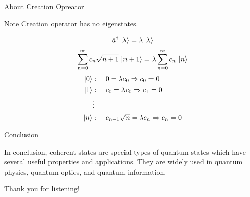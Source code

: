 \documentclass{loyola-beamer}
\begin{document}
\begin{frame}{About Creation Opreator}
    \begin{alertblock}{Note}
        Creation operator has no eigenstates.
    \end{alertblock}
    \begin{align*}
        \hat{a}^\dagger \ket{\lambda} = \lambda \ket{\lambda}
    \end{align*}
    \begin{align*}
        \sum_{n=0}^\infty c_n \sqrt{n+1}\, \ket{n+1}
        = \lambda \sum_{n=0}^\infty c_n\, \ket{n}
    \end{align*}
    \begin{align*}
        \ket{0} & : \quad 0 = \lambda c_0 \Rightarrow c_0 =0               \\
        \ket{1} & : \quad c_0 = \lambda c_0 \Rightarrow c_1 =0             \\
                & \vdots                                                   \\
        \ket{n} & : \quad c_{n-1} \sqrt{n}=\lambda c_n \Rightarrow c_n = 0
    \end{align*}

\end{frame}

\begin{frame}{Conclusion}

    In conclusion, coherent states are special types of quantum states which have several
    useful properties and applications. They are widely used in quantum physics, quantum optics,
    and quantum information.

\end{frame}





\begin{titleframe}{Thank you for listening!}

\end{titleframe}
\end{document}

